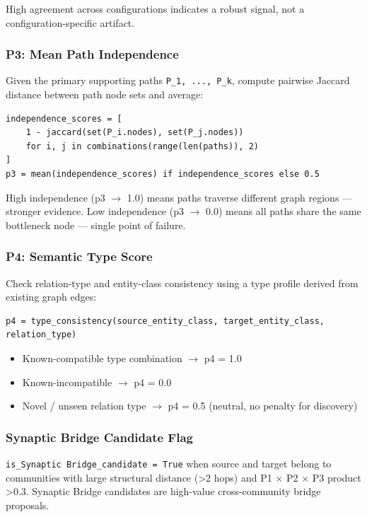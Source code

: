 High agreement across confi\-gurations indicates a robust signal, not a confi\-guration-specific artifact.

\subsubsection{P3: Mean Path Indepe\-ndence}

Given the primary supporting paths \texttt{{P\_1, ..., P\_k}}, compute pairwise Jaccard distance between path node sets and average:

\begin{lstlisting}
independence_scores = [
    1 - jaccard(set(P_i.nodes), set(P_j.nodes))
    for i, j in combinations(range(len(paths)), 2)
]
p3 = mean(independence_scores) if independence_scores else 0.5
\end{lstlisting}

High indep\-endence (p3 $\to$ 1.0) means paths traverse different graph regions — stronger evidence. Low indep\-endence (p3 $\to$ 0.0) means all paths share the same bottleneck node — single point of failure.

\subsubsection{P4: Semantic Type Score}

Check relation-type and entity-class consistency using a type profile derived from existing graph edges:

\begin{lstlisting}
p4 = type_consistency(source_entity_class, target_entity_class, relation_type)
\end{lstlisting}

\begin{itemize}
\item Known-compatible type combination $\to$ p4 = 1.0
\item Known-incom\-patible $\to$ p4 = 0.0
\item Novel / unseen relation type $\to$ p4 = 0.5 (neutral, no penalty for discovery)

\end{itemize}
\subsubsection{Synaptic Bridge Candidate Flag}

\texttt{is\_Synaptic Bridge\_candidate = True} when source and target belong to communities with large structural distance (\textgreater  2 hops) and P1 $\times$ P2 $\times$ P3 product \textgreater  0.3. Synaptic Bridge candidates are high-value cross-community bridge proposals.

